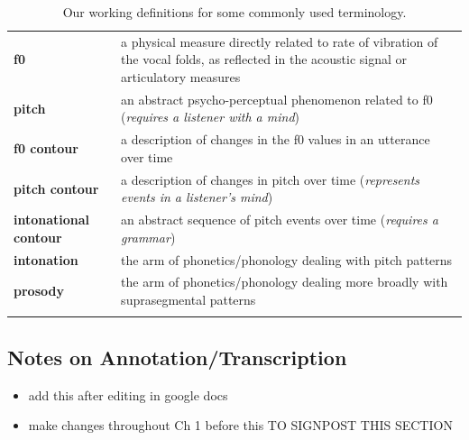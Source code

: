 \documentclass[11pt, twoside]{memoir}
\begin{document}
\begin{longtable}{>{\bfseries}p{.175\linewidth}p{.75\linewidth}} \endhead\toprule 
f0 &
a physical measure directly related to rate of vibration of the vocal folds, as reflected in the acoustic signal or articulatory measures
\tabularnewline\hdashline
pitch &
an abstract psycho-perceptual phenomenon related to f0 (\textit{requires a listener with a mind})
\tabularnewline\hdashline
f0 contour &
a description of changes in the f0 values in an utterance over time
\tabularnewline\hdashline
pitch contour &
a description of changes in pitch over time (\textit{represents events in a listener’s mind})
\tabularnewline\hdashline
intonational contour &
an abstract sequence of pitch events over time (\textit{requires a grammar})
\tabularnewline\hdashline
intonation &
the arm of phonetics\slash phonology dealing with pitch patterns
\tabularnewline\hdashline
prosody &
the arm of phonetics\slash phonology dealing more broadly with suprasegmental patterns
\tabularnewline\bottomrule 
\caption{Our working definitions for some commonly used terminology.
\label{tab:terminology}
}
\end{longtable}



\subsection{Notes on Annotation/Transcription}\label{sec:notes on annotation and transcription}

\begingroup\color{red}
\begin{itemize}
	\tightlist
	\item add this after editing in google docs
	\item make changes throughout Ch 1 before this TO SIGNPOST THIS SECTION 
\end{itemize}
\endgroup

\end{document}
